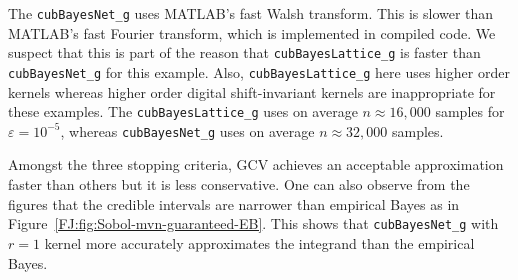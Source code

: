 \documentclass[graybox,footinfo]{svmult}
\begin{document}
The \texttt{cubBayesNet\_g} uses MATLAB's fast Walsh transform.  This is slower than MATLAB's fast Fourier transform, which is implemented in compiled code. We suspect that this is part of the reason that \texttt{cubBayesLattice\_g} is faster than \texttt{cubBayesNet\_g} for this example. Also, \texttt{cubBayesLattice\_g} here uses higher order kernels whereas higher order digital shift-invariant kernels are inappropriate for these examples. The \texttt{cubBayesLattice\_g} uses on average $n \approx 16{,}000$ samples for $\varepsilon = 10^{-5}$, whereas \texttt{cubBayesNet\_g} uses on average $n \approx 32{,}000$ samples.

Amongst the three stopping criteria, GCV achieves an acceptable approximation faster than others but it is less conservative. 
One can also observe from the figures that the credible intervals are narrower than empirical Bayes as in Figure~\ref{FJ:fig:Sobol-mvn-guaranteed-EB}.
This shows that \texttt{cubBayesNet\_g} with $r=1$ kernel more accurately approximates the integrand than the empirical Bayes.
\end{document}

